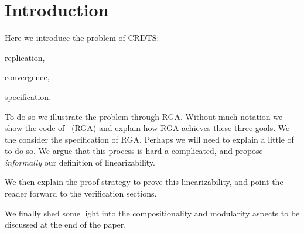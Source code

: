 \section{Introduction}
\label{sec:introduction}


Here we introduce the problem of CRDTS:
\begin{inparaenum}
\item replication, 
\item convergence, 
\item specification.
\end{inparaenum}
To do so we illustrate the problem through RGA. Without much notation
we show the code of~\cite{ShapiroPBZ11} (RGA) and explain how RGA achieves
these three goals.
%
We the consider the specification of RGA. Perhaps we will need to
explain a little of~\cite{BurckhardtGYZ14} to do so.
%
We argue that this process is hard a complicated, and propose
\emph{informally} our definition of linearizability.

We then explain the proof strategy to prove this linearizability, and
point the reader forward to the verification sections. 

We finally shed some light into the compositionality and modularity
aspects to be discussed at the end of the paper. 


